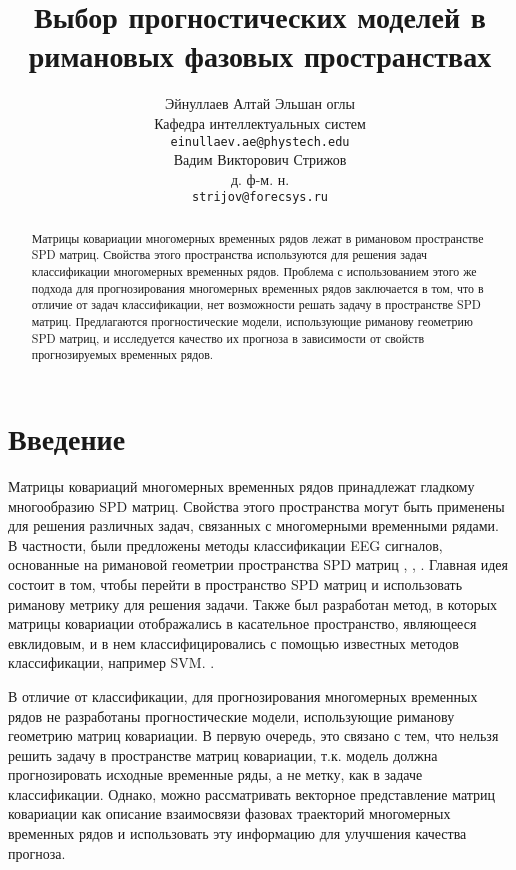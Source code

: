 \documentclass{article}
\title{Выбор прогностических моделей в римановых фазовых пространствах}
\author{ Эйнуллаев Алтай Эльшан оглы\\
	Кафедра интеллектуальных систем\\
	\texttt{einullaev.ae@phystech.edu} \\
	\And
	Вадим Викторович Стрижов \\
	д. ф-м. н.\\
	\texttt{strijov@forecsys.ru} \\
}
\date{}
\begin{document}
\maketitle

\begin{abstract}
	Матрицы ковариации многомерных временных рядов лежат в римановом пространстве SPD матриц. Свойства этого пространства используются для решения задач классификации многомерных временных рядов. Проблема с использованием этого же подхода для прогнозирования многомерных временных рядов заключается в том, что в отличие от задач классификации, нет возможности решать задачу в пространстве SPD матриц. Предлагаются прогностические модели, использующие риманову геометрию SPD матриц, и исследуется качество их прогноза в зависимости от свойств прогнозируемых временных рядов.

\end{abstract}



\section{Введение}

Матрицы ковариаций многомерных временных рядов принадлежат гладкому многообразию SPD матриц. Свойства этого пространства \cite{moakher2005differential} могут быть применены для решения различных задач, связанных с многомерными временными рядами. В частности, были предложены методы классификации EEG сигналов, основанные на римановой геометрии пространства SPD матриц \cite{barachant2010riemannian}, \cite{barachant2011multiclass}, \cite{congedo2017riemannian}. Главная идея состоит в том, чтобы перейти в пространство SPD матриц и использовать риманову метрику для решения задачи. Также был разработан метод, в которых матрицы ковариации отображались в касательное пространство, являющееся евклидовым, и в нем классифицировались с помощью известных методов классификации, например SVM. \cite{barachant2013classification}. 

В отличие от классификации, для прогнозирования многомерных временных рядов не разработаны прогностические модели, использующие риманову геометрию матриц ковариации. В первую очередь, это связано с тем, что нельзя решить задачу в пространстве матриц ковариации, т.к. модель должна прогнозировать исходные временные ряды, а не метку, как в задаче классификации. Однако, можно рассматривать векторное представление матриц ковариации как описание взаимосвязи фазовах траекторий многомерных временных рядов и использовать эту информацию для улучшения качества прогноза. 
\end{document}
